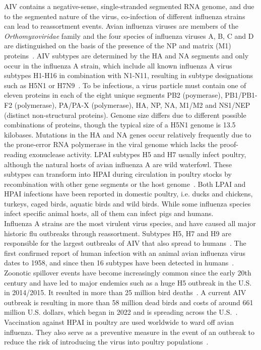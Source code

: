 \ac{AIV} contains a negative-sense, single-stranded segmented \ac{RNA} genome, and due to the segmented nature of the virus, co-infection of different influenza strains can lead to reassortment events. Avian influenza viruses are members of the \textit{Orthomyxoviridae} family and the four species of influenza viruses A, B, C and D are distinguished on the basis of the presence of the \ac{NP} and matrix (M1) proteins~\cite{webster1992evolution}. \ac{AIV} subtypes are determined by the \ac{HA} and \ac{NA} segments and only occur in the influenza A strain, which include all known influenza A virus subtypes H1-H16 in combination with N1-N11, resulting in subtype designations such as H5N1 or H7N9~\cite{webster1992evolution, krammer2018influenza}. To be infectious, a virus particle must contain one of eleven proteins in each of the eight unique segments PB2 (poymerase), PB1/PB1-F2 (polymerase), PA/PA-X (polymerase), \ac{HA}, \ac{NP}, \ac{NA}, M1/M2 and NS1/NEP (distinct non-structural proteins). Genome size differs due to different possible combinations of proteins, though the typical size of a H5N1 genome is 13.5 kilobases. Mutations in the \ac{HA} and \ac{NA} genes occur relatively frequently due to the prone-error \ac{RNA} polymerase in the viral genome which lacks the proof-reading exonuclease activity. \ac{LPAI} subtypes H5 and H7 usually infect poultry, although the natural hosts of avian influenza A are wild waterfowl. These subtypes can transform into \ac{HPAI} during circulation in poultry stocks by recombination with other gene segments or the host genome~\cite{webster2006h5n1}. Both \ac{LPAI} and \ac{HPAI} infections have been reported in domestic poultry, i.e. ducks and chickens, turkeys, caged birds, aquatic birds and wild birds. While some influenza species infect specific animal hosts, all of them can infect pigs and humans. \\
Influenza A strains are the most virulent virus species, and have caused all major historic flu outbreaks through reassortment. Subtypes H5, H7 and H9 are responsible for the largest outbreaks of \ac{AIV} that also spread to humans~\cite{widdowson2017global}. The first confirmed report of human infection with an animal avian influenza virus dates to 1958, and since then 16 subtypes have been detected in humans~\cite{kluska1961demonstration}. Zoonotic spillover events have become increasingly common since the early 20th century and have led to major endemics such as a huge H5 outbreak in the U.S. in 2014/2015. It resulted in more than 25 million bird deaths~\cite{seeger2021poultry}. A current AIV outbreak is resulting in more than 58 million dead birds and costs of around 661 million U.S. dollars, which began in 2022 and is spreading across the U.S.~\cite{usda2023hpai}. 
Vaccination against \ac{HPAI} in poultry are used worldwide to ward off avian influenza. They also serve as a preventive measure in the event of an outbreak to reduce the risk of introducing the virus into poultry populations~\cite{swayne2013current, swayne2011assessment}. 

